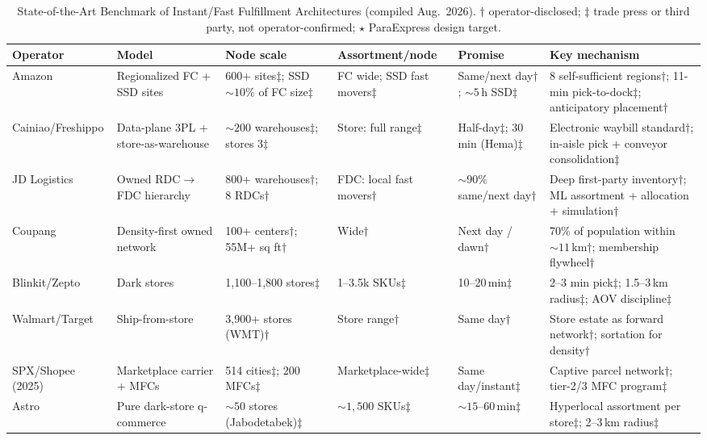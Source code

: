 \begin{table}[t]
\caption{State-of-the-Art Benchmark of Instant/Fast Fulfillment Architectures (compiled Aug.\ 2026). $\dagger$ operator-disclosed; $\ddagger$ trade press or third party, not operator-confirmed; $\star$ ParaExpress design target.}
\label{tab:bench}
\centering\footnotesize
\begin{tabular}{@{}p{1.9cm}p{2.6cm}p{2.9cm}p{2.0cm}p{2.2cm}p{4.0cm}@{}}
\toprule
\textbf{Operator} & \textbf{Model} & \textbf{Node scale} & \textbf{Assortment/node} & \textbf{Promise} & \textbf{Key mechanism}\\
\midrule
Amazon & Regionalized FC + SSD sites & 600+ sites$\ddagger$; SSD ${\sim}10\%$ of FC size$\ddagger$ & FC wide; SSD fast movers$\ddagger$ & Same/next day$\dagger$; ${\sim}5$\,h SSD$\ddagger$ & 8 self-sufficient regions$\dagger$; 11-min pick-to-dock$\ddagger$; anticipatory placement$\dagger$\\
Cainiao/Freshippo & Data-plane 3PL + store-as-warehouse & ${\sim}200$ warehouses$\ddagger$; stores 3$\ddagger$ & Store: full range$\ddagger$ & Half-day$\ddagger$; 30\,min (Hema)$\ddagger$ & Electronic waybill standard$\dagger$; in-aisle pick + conveyor consolidation$\ddagger$\\
JD Logistics & Owned RDC$\to$FDC hierarchy & 800+ warehouses$\dagger$; 8 RDCs$\dagger$ & FDC: local fast movers$\dagger$ & ${\sim}90\%$ same/next day$\dagger$ & Deep first-party inventory$\dagger$; ML assortment + allocation + simulation$\dagger$\\
Coupang & Density-first owned network & 100+ centers$\dagger$; 55M+ sq ft$\dagger$ & Wide$\dagger$ & Next day / dawn$\dagger$ & 70\% of population within ${\sim}11$\,km$\dagger$; membership flywheel$\dagger$\\
Blinkit/Zepto & Dark stores & 1,100--1,800 stores$\ddagger$ & 1--3.5k SKUs$\ddagger$ & 10--20\,min$\ddagger$ & 2--3 min pick$\ddagger$; 1.5--3\,km radius$\ddagger$; AOV discipline$\ddagger$\\
Walmart/Target & Ship-from-store & 3,900+ stores (WMT)$\dagger$ & Store range$\dagger$ & Same day$\dagger$ & Store estate as forward network$\dagger$; sortation for density$\dagger$\\
SPX/Shopee (2025) & Marketplace carrier + MFCs & 514 cities$\ddagger$; 200 MFCs$\ddagger$ & Marketplace-wide$\ddagger$ & Same day/instant$\ddagger$ & Captive parcel network$\dagger$; tier-2/3 MFC program$\ddagger$\\
Astro & Pure dark-store q-commerce & ${\sim}50$ stores (Jabodetabek)$\ddagger$ & ${\sim}1{,}500$ SKUs$\ddagger$ & ${\sim}15$--60\,min$\ddagger$ & Hyperlocal assortment per store$\ddagger$; 2--3\,km radius$\ddagger$\\

\end{tabular}
\end{table}
